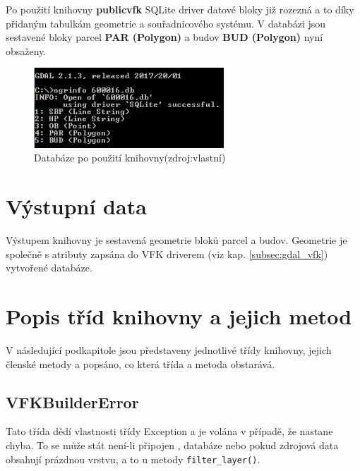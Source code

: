 Po použití knihovny \textbf{publicvfk} SQLite driver datové bloky již
rozezná a to díky přidaným tabulkám geometrie a souřadnicového systému. V
databázi jsou sestavené bloky parcel
\textbf{PAR (Polygon)} a budov \textbf{BUD (Polygon)} nyní obsaženy.
\begin{figure}[H]
	 \centering
     \includegraphics[height=3cm]{./pictures/funkcnost_knihovny_po.png}
     \caption{Databáze po použití knihovny(zdroj:vlastní)}
     \label{fig:funkcnost_po}
\end{figure}  
  
\section{Výstupní data}
Výstupem knihovny je sestavená geometrie bloků parcel a
budov. Geometrie je společně s atributy zapsána do VFK
driverem (viz kap. \ref{subsec:gdal_vfk}) vytvořené databáze.

\section{Popis tříd knihovny a jejich metod}
\label{sec:popis_trid}
V následující podkapitole jsou představeny jednotlivé třídy knihovny,
jejich členské metody a popsáno, co která třída a metoda obstarává.

\subsection{VFKBuilderError}
Tato třída dědí vlastnosti třídy Exception a je volána v případě, že
nastane chyba. To se může stát není-li připojen , databáze
nebo pokud zdrojová data obsahují prázdnou vrstvu, a to u metody
\verb|filter_layer()|.
